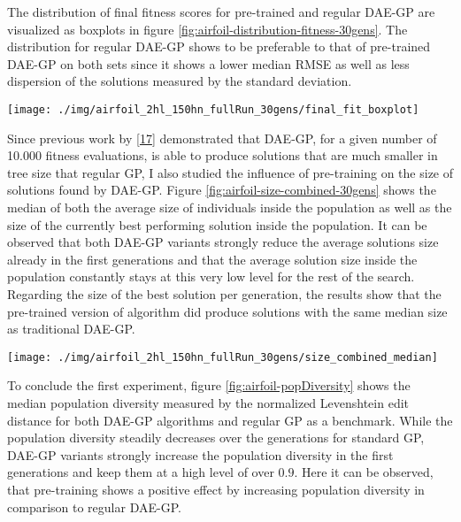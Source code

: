 \documentclass[
  11pt,
]{article}
\let\origfigure\figure
\let\endorigfigure\endfigure
\renewenvironment{figure}[1][2] {
    \expandafter\origfigure\expandafter[H]
} {
    \endorigfigure
}
\begin{document}
The distribution of final fitness scores for pre-trained and regular DAE-GP are visualized as boxplots in figure \ref{fig:airfoil-distribution-fitness-30gens}. The distribution for regular DAE-GP shows to be preferable to that of pre-trained DAE-GP on both sets since it shows a lower median RMSE as well as less dispersion of the solutions measured by the standard deviation.

\begin{figure}[c]

{\centering \texttt{[image: ./img/airfoil\_2hl\_150hn\_fullRun\_30gens/final\_fit\_boxplot]} 

}

\caption{Best Fitness after 30 Generations - Airfoil (2HL)}\label{fig:airfoil-distribution-fitness-30gens}
\end{figure}

Since previous work by {[}\protect\hyperlink{ref-dae-gp_2022_symreg}{17}{]} demonstrated that DAE-GP, for a given number of 10.000 fitness evaluations, is able to produce solutions that are much smaller in tree size that regular GP, I also studied the influence of pre-training on the size of solutions found by DAE-GP. Figure \ref{fig:airfoil-size-combined-30gens} shows the median of both the average size of individuals inside the population as well as the size of the currently best performing solution inside the population. It can be observed that both DAE-GP variants strongly reduce the average solutions size already in the first generations and that the average solution size inside the population constantly stays at this very low level for the rest of the search. Regarding the size of the best solution per generation, the results show that the pre-trained version of algorithm did produce solutions with the same median size as traditional DAE-GP.

\begin{figure}[c]

{\centering \texttt{[image: ./img/airfoil\_2hl\_150hn\_fullRun\_30gens/size\_combined\_median]} 

}

\caption{Median Solution Size over 30 Generations - Airfoil (2HL)}\label{fig:airfoil-size-combined-30gens}
\end{figure}

To conclude the first experiment, figure \ref{fig:airfoil-popDiversity} shows the median population diversity measured by the normalized Levenshtein edit distance for both DAE-GP algorithms and regular GP as a benchmark. While the population diversity steadily decreases over the generations for standard GP, DAE-GP variants strongly increase the population diversity in the first generations and keep them at a high level of over \(0.9\). Here it can be observed, that pre-training shows a positive effect by increasing population diversity in comparison to regular DAE-GP.
\end{document}
